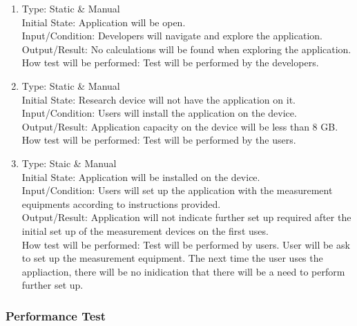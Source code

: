 \documentclass[12pt, titlepage]{article}
\begin{document}
\begin{adjustwidth}{2.2em}{0pt}
\begin{enumerate}[{NF-UT}1.]
    \item Type: Static \& Manual\\
    Initial State: Application will be open.\\
    Input/Condition: Developers will navigate and explore the application.\\
    Output/Result: No calculations will be found when exploring the application. \\
    How test will be performed: Test will be performed by the developers.

    \item Type: Static \& Manual\\
    Initial State: Research device will not have the application on it.\\
    Input/Condition: Users will install the application on the device.\\
    Output/Result: Application capacity on the device will be less than 8 GB.\\
    How test will be performed: Test will be performed by the users.

    \item Type: Staic \& Manual\\
    Initial State: Application will be installed on the device.\\
    Input/Condition: Users will set up the application with the measurement equipments according to instructions provided.\\
    Output/Result: Application will not indicate further set up required after the initial set up of the measurement devices on the first uses.\\
    How test will be performed: Test will be performed by users. User will be ask to set up the measurement equipment. The next time the user uses the appliaction, there will be no inidication that there will be a need to perform further set up. 
\end{enumerate}
\end{adjustwidth}

\subsubsection{Performance Test}
\end{document}
